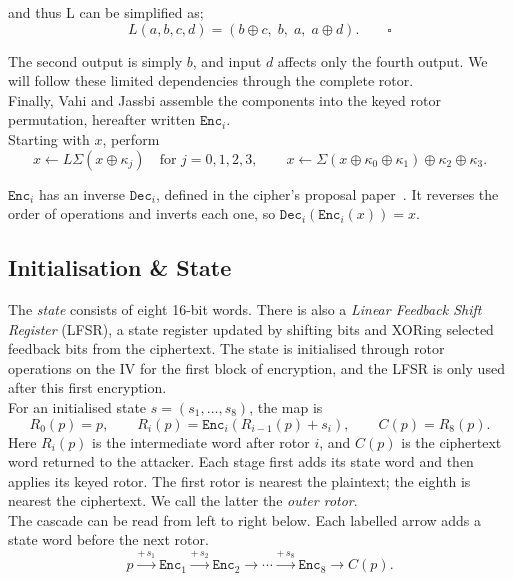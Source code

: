 \documentclass[11pt]{article}
\newcommand{\xor}{\mathbin\oplus}
\begin{document}
and thus L can be simplified as;
\begin{equation}
\boxed{L(a,b,c,d)=(b\oplus c,\;b,\;a,\;a\oplus d).}
\qquad\square
\label{eq:linear}
\end{equation}

The second output is simply $b$, and input $d$ affects only the fourth
output. We will follow these limited dependencies through the complete
rotor.\\

Finally, Vahi and Jassbi assemble the components into the keyed rotor permutation,
hereafter written $\mathtt{Enc}_i$.\\

Starting with \(x\), perform
\[
 x\leftarrow L\Sigma(x\xor\kappa_j)\quad\text{for }j=0,1,2,3,
 \qquad
 x\leftarrow\Sigma(x\xor\kappa_0\xor\kappa_1)\xor\kappa_2\xor\kappa_3.
\]

$\mathtt{Enc}_i$ has an inverse $\mathtt{Dec}_i$, defined in the cipher's
proposal paper~\cite{separ}. It reverses the order of operations and inverts
each one, so $\mathtt{Dec}_i(\mathtt{Enc}_i(x))=x$.\\

\subsection{Initialisation \& State}

The \emph{state} consists of eight 16-bit words. There is also
a \textit{Linear Feedback Shift Register} (LFSR), a state register
updated by shifting bits and XORing selected feedback bits from the ciphertext. The state is initialised through rotor operations on the IV for the first block of encryption, and the LFSR is only used after this first encryption.\\

For an initialised state \(s=(s_1,\ldots,s_8)\), the map is
\begin{equation}
 R_0(p)=p,\qquad R_i(p)=\mathtt{Enc}_i(R_{i-1}(p)+s_i),\qquad C(p)=R_8(p).
 \label{eq:cascade}
\end{equation}
Here \(R_i(p)\) is the intermediate word after rotor \(i\), and
\(C(p)\) is the ciphertext word returned to the attacker. Each
stage first adds its state word and then applies its keyed rotor.
The first rotor is nearest the plaintext; the eighth is nearest
the ciphertext. We call the latter the \emph{outer rotor}.\\

The cascade can be read from left to right below. Each labelled arrow
adds a state word before the next rotor.
\[
p\xrightarrow{+\,s_1}\boxed{\mathtt{Enc}_1}
 \xrightarrow{+\,s_2}\boxed{\mathtt{Enc}_2}
 \longrightarrow\cdots
 \xrightarrow{+\,s_8}\boxed{\mathtt{Enc}_8}
 \longrightarrow C(p).
\]
\end{document}
